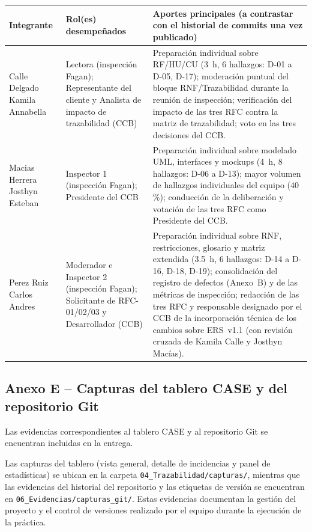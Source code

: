 \documentclass[11pt,a4paper]{article}
\begin{document}
\begin{longtable}{|p{4cm}|p{3.8cm}|p{6.2cm}|}
\hline
\textbf{Integrante} & \textbf{Rol(es) desempeñados} & \textbf{Aportes principales (a contrastar con el historial de commits una vez publicado)} \\
\hline
Calle Delgado Kamila Annabella & Lectora (inspección Fagan); Representante del cliente y Analista de impacto de trazabilidad (CCB) & Preparación individual sobre RF/HU/CU (3~h, 6 hallazgos: D-01 a D-05, D-17); moderación puntual del bloque RNF/Trazabilidad durante la reunión de inspección; verificación del impacto de las tres RFC contra la matriz de trazabilidad; voto en las tres decisiones del CCB. \\
\hline
Macias Herrera Josthyn Esteban & Inspector 1 (inspección Fagan); Presidente del CCB & Preparación individual sobre modelado UML, interfaces y mockups (4~h, 8 hallazgos: D-06 a D-13); mayor volumen de hallazgos individuales del equipo (40\,\%); conducción de la deliberación y votación de las tres RFC como Presidente del CCB. \\
\hline
Perez Ruiz Carlos Andres & Moderador e Inspector 2 (inspección Fagan); Solicitante de RFC-01/02/03 y Desarrollador (CCB) & Preparación individual sobre RNF, restricciones, glosario y matriz extendida (3.5~h, 6 hallazgos: D-14 a D-16, D-18, D-19); consolidación del registro de defectos (Anexo~B) y de las métricas de inspección; redacción de las tres RFC y responsable designado por el CCB de la incorporación técnica de los cambios sobre ERS~v1.1 (con revisión cruzada de Kamila Calle y Josthyn Macías). \\
\hline
\end{longtable}

\subsection*{Anexo E -- Capturas del tablero CASE y del repositorio Git}

Las evidencias correspondientes al tablero CASE y al repositorio Git se encuentran incluidas en la entrega.

Las capturas del tablero (vista general, detalle de incidencias y panel de estadísticas) se ubican en la carpeta \texttt{04\_Trazabilidad/capturas/}, mientras que las evidencias del historial del repositorio y las etiquetas de versión se encuentran en \texttt{06\_Evidencias/capturas\_git/}. Estas evidencias documentan la gestión del proyecto y el control de versiones realizado por el equipo durante la ejecución de la práctica.
\end{document}
